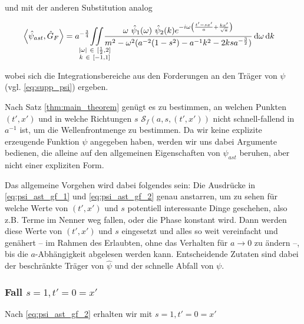 
und mit der anderen Substitution analog

\begin{align}
    \left< \hat\psi_{ast}, \hat G_F \right>
    &=
    a^{-\frac{3}{4}}
    \kern -1em
    \iint \limits_{\substack{
        |\omega|~ \in~ [\frac{1}{2},2] \\
        k ~\in~ [-1,1]
        }
    }
    \kern -1em
    \frac{
        \omega ~\hat \psi_1(\omega) ~\hat \psi_2(k)
        e^{-i \omega \left(\frac{t' - sx'}{a} + \frac{kx'}{\sqrt{a}}\right)}
    }
    {
        m^2 - \omega^2(a^{-2}(1-s^2)-a^{-1}k^2 - 2 k s a^{-\frac{3}{2}})
    }
    \d \omega \d k
    \label{eq:psi_ast_gf_2}
\end{align}

wobei sich die Integrationsbereiche aus den Forderungen an den Träger von $\psi$
(vgl. \eqref{eq:supp_psi}) ergeben.




Nach Satz \eqref{thm:main_theorem} genügt es zu bestimmen, an welchen Punkten
$(t', x')$ und in welche Richtungen $s$ $\mathcal{S}_f(a,s,(t',x'))$ nicht schnell-fallend
in $a^{-1}$ ist, um die Wellenfrontmenge zu bestimmen. Da wir keine explizite
erzeugende Funktion $\psi$ angegeben haben, werden wir uns dabei Argumente bedienen,
die alleine auf den allgemeinen Eigenschaften von $\psi_{ast}$ beruhen, aber nicht
einer expliziten Form.

Das allgemeine Vorgehen wird dabei folgendes sein: Die Ausdrücke in \eqref{eq:psi_ast_gf_1}
und \eqref{eq:psi_ast_gf_2} genau anstarren, um zu sehen für welche Werte von
$(t',x')$ und $s$ potentiell interessante Dinge geschehen, also z.B. Terme im Nenner
weg fallen, oder die Phase konstant wird. Dann werden diese Werte von $(t',x')$ und
$s$ eingesetzt und alles so weit vereinfacht und genähert -- im Rahmen des Erlaubten, ohne
das Verhalten für $a \rightarrow 0$ zu ändern --, bis die $a$-Abhängigkeit abgelesen
werden kann. Entscheidende Zutaten sind dabei der beschränkte Träger von $\hat \psi$
und der schnelle Abfall von $\psi$.


\subsubsection*{Fall $s=1, t' = 0 = x'$}
Nach \eqref{eq:psi_ast_gf_2} erhalten wir mit $s=1, t' = 0 = x'$

